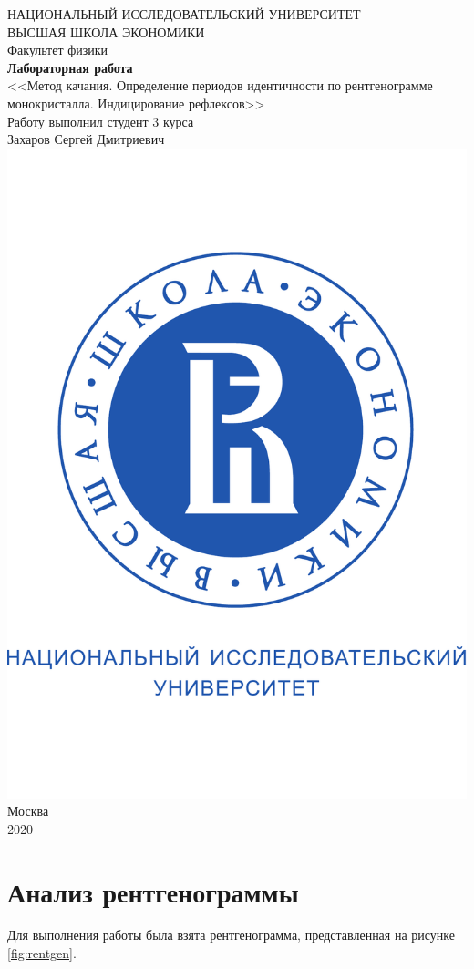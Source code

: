 \documentclass[a4paper, 12pt]{article}
\begin{document}
	\begin{titlepage}
		\begin{center}
			$$$$
			$$$$
			$$$$
			$$$$
			{\Large{НАЦИОНАЛЬНЫЙ ИССЛЕДОВАТЕЛЬСКИЙ УНИВЕРСИТЕТ}}\\
			\vspace{0.1cm}
			{\Large{ВЫСШАЯ ШКОЛА ЭКОНОМИКИ}}\\
			\vspace{0.25cm}
			{\large{Факультет физики}}\\
			\vspace{4cm}
			{\Huge\textbf{{Лабораторная работа}}}\\%
			\vspace{1cm}
			{\LARGE{<<Метод качания. Определение периодов идентичности по рентгенограмме монокристалла. Индицирование рефлексов>>}}\\%
			\vspace{2cm}
			{Работу выполнил студент 3 курса}\\
			{Захаров Сергей Дмитриевич}
			\vfill
			\includegraphics[width=0.2\linewidth]{HSElogo}
			\vfill
			Москва\\
			2020
		\end{center}
	\end{titlepage}

\tableofcontents

\newpage

\section{Анализ рентгенограммы}

Для выполнения работы была взята рентгенограмма, представленная на рисунке \ref{fig:rentgen}.
\end{document}
